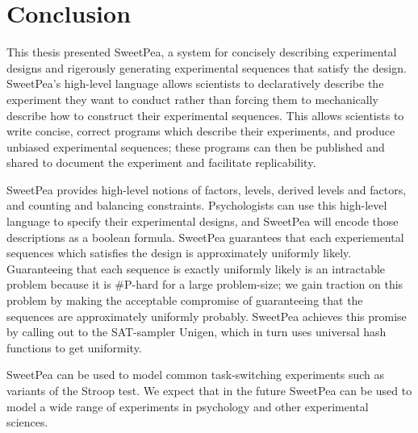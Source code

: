 \chapter{Conclusion}

This thesis presented SweetPea, a system for concisely describing experimental designs and rigerously generating experimental sequences that satisfy the design. SweetPea's high-level language allows scientists to declaratively describe the experiment they want to conduct rather than forcing them to mechanically describe how to construct their experimental sequences. This allows scientists to write concise, correct programs which describe their experiments, and produce unbiased experimental sequences; these programs can then be published and shared to document the experiment and facilitate replicability.

SweetPea provides high-level notions of factors, levels, derived levels and factors, and counting and balancing constraints. Psychologists can use this high-level language to specify their experimental designs, and SweetPea will encode those descriptions as a boolean formula. SweetPea guarantees that each experiemental sequences which satisfies the design is approximately uniformly likely. Guaranteeing that each sequence is exactly uniformly likely is an intractable problem because it is \#P-hard for a large problem-size; we gain traction on this problem by making the acceptable compromise of guaranteeing that the sequences are approximately uniformly probably. SweetPea achieves this promise by calling out to the SAT-sampler Unigen, which in turn uses universal hash functions to get uniformity.

SweetPea can be used to model common task-switching experiments such as variants of the Stroop test. We expect that in the future SweetPea can be used to model a wide range of experiments in psychology and other experimental sciences.
